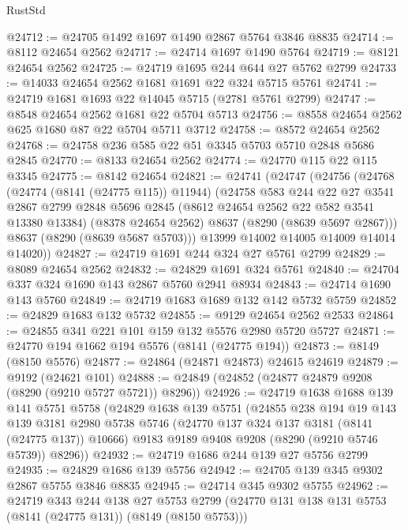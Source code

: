 \begin{lexlean}{RustStd}
\begin{coremodule}
@24712 := @24705 @1492 @1697 @1490 @2867 @5764 @3846 @8835
@24714 := @8112 @24654 @2562
@24717 := @24714 @1697 @1490 @5764
@24719 := @8121 @24654 @2562
@24725 := @24719 @1695 @244 @644 @27 @5762 @2799
@24733 := @14033 @24654 @2562 @1681 @1691 @22 @324 @5715 @5761
@24741 := @24719 @1681 @1693 @22 @14045 @5715 (@2781 @5761 @2799)
@24747 := @8548 @24654 @2562 @1681 @22 @5704 @5713
@24756 := @8558 @24654 @2562 @625 @1680 @87 @22 @5704 @5711 @3712
@24758 := @8572 @24654 @2562
@24768 := @24758 @236 @585 @22 @51 @3345 @5703 @5710 @2848 @5686 @2845
@24770 := @8133 @24654 @2562
@24774 := @24770 @115 @22 @115 @3345
@24775 := @8142 @24654
@24821 := @24741
    (@24747
      (@24756
        (@24768
          (@24774 (@8141 (@24775 @115)) @11944)
          (@24758
            @583
            @244
            @22
            @27
            @3541
            @2867
            @2799
            @2848
            @5696
            @2845
            (@8612 @24654 @2562 @22 @582 @3541 @13380 @13384)
            (@8378 @24654 @2562)
            @8637
            (@8290 (@8639 @5697 @2867)))
          @8637
          (@8290 (@8639 @5687 @5703)))
        @13999
        @14002
        @14005
        @14009
        @14014
        @14020))
@24827 := @24719 @1691 @244 @324 @27 @5761 @2799
@24829 := @8089 @24654 @2562
@24832 := @24829 @1691 @324 @5761
@24840 := @24704 @337 @324 @1690 @143 @2867 @5760 @2941 @8934
@24843 := @24714 @1690 @143 @5760
@24849 := @24719 @1683 @1689 @132 @142 @5732 @5759
@24852 := @24829 @1683 @132 @5732
@24855 := @9129 @24654 @2562 @2533
@24864 := @24855 @341 @221 @101 @159 @132 @5576 @2980 @5720 @5727
@24871 := @24770 @194 @1662 @194 @5576 (@8141 (@24775 @194))
@24873 := @8149 (@8150 @5576)
@24877 := @24864 (@24871 @24873) @24615 @24619
@24879 := @9192 (@24621 @101)
@24888 := @24849 (@24852 (@24877 @24879 @9208 (@8290 (@9210 @5727 @5721)) @8296))
@24926 := @24719
    @1638
    @1688
    @139
    @141
    @5751
    @5758
    (@24829
      @1638
      @139
      @5751
      (@24855
        @238
        @194
        @19
        @143
        @139
        @3181
        @2980
        @5738
        @5746
        (@24770 @137 @324 @137 @3181 (@8141 (@24775 @137)) @10666)
        @9183
        @9189
        @9408
        @9208
        (@8290 (@9210 @5746 @5739))
        @8296))
@24932 := @24719 @1686 @244 @139 @27 @5756 @2799
@24935 := @24829 @1686 @139 @5756
@24942 := @24705 @139 @345 @9302 @2867 @5755 @3846 @8835
@24945 := @24714 @345 @9302 @5755
@24962 := @24719
    @343
    @244
    @138
    @27
    @5753
    @2799
    (@24770 @131 @138 @131 @5753 (@8141 (@24775 @131)) (@8149 (@8150 @5753)))

\end{coremodule}
\end{lexlean}
